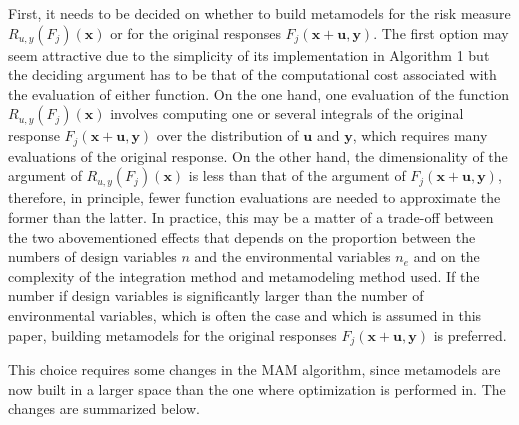 \documentclass{llncs}
\begin{document}
First, it needs to be decided on whether to build metamodels for the risk measure $R_{u,y}(F_j)(\boldsymbol x)$ or for the original responses $F_j (\boldsymbol x+ \boldsymbol u,\boldsymbol y)$. The first option may seem attractive due to the simplicity of its implementation in Algorithm 1 but the deciding argument has to be that of the computational cost associated with the evaluation of either function. On the one hand, one evaluation of the function $R_{u,y}(F_j)(\boldsymbol x)$ involves computing one or several integrals of the original response $F_j(\boldsymbol x+ \boldsymbol u,\boldsymbol y)$ over the distribution of $\boldsymbol u$ and $\boldsymbol y$, which requires many evaluations of the original response. On the other hand, the dimensionality of the argument of $R_{u,y}(F_j)(\boldsymbol x)$ is less than that of the argument of $F_j(\boldsymbol x+ \boldsymbol u,\boldsymbol y)$, therefore, in principle, fewer function evaluations are needed to approximate the former than the latter. In practice, this may be a matter of a trade-off between the two abovementioned effects that depends on the proportion between the numbers of design variables $n$ and the environmental variables $n_e$ and on the complexity of the integration method and metamodeling method used. If the number if design variables is significantly larger than the number of environmental variables, which is often the case and which is assumed in this paper, building metamodels for the original responses $F_j(\boldsymbol x+ \boldsymbol u,\boldsymbol y)$ is preferred.

This choice requires some changes in the MAM algorithm, since metamodels are now built in a larger space than the one where optimization is performed in. The changes are summarized below.
\end{document}
